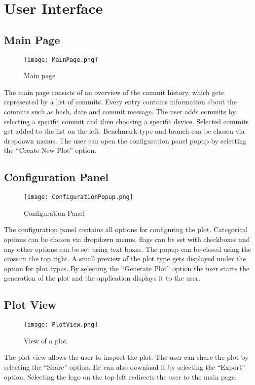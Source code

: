 \section{User Interface}

\subsection{Main Page}

\begin{figure}[H]
    \texttt{[image: MainPage.png]}
    \caption{Main page}
    \label{ui:main}
\end{figure}

The main page consists of an overview of the commit history, which gets represented by a list of commits. Every entry contains information about the commits such as hash, date and commit message. The user adds commits by selecting a specific commit and then choosing a specific device. Selected commits get added to the list on the left. Benchmark type and branch can be chosen via dropdown menus. The user can open the configuration panel popup by selecting the \enquote{Create New Plot} option.

\subsection{Configuration Panel}

\begin{figure}[H]
    \texttt{[image: ConfigurationPopup.png]}
    \caption{Configuration Panel}
    \label{ui:config}
\end{figure}

The configuration panel contains all options for configuring the \gls{plot}. Categorical options can be chosen via dropdown menus, flags can be set with checkboxes and any other options can be set using text boxes. The popup can be closed using the cross in the top right. A small preview of the \gls{plot} type gets displayed under the option for \glspl{plot type}. By selecting the \enquote{Generate Plot} option the user starts the generation of the \gls{plot} and the application displays it to the user.

\subsection{Plot View}

\begin{figure}[H]
    \texttt{[image: PlotView.png]}
    \caption{View of a \gls{plot}}
    \label{ui:plot}
\end{figure}

The plot view allows the user to inspect the \gls{plot}. The user can share the \gls{plot} by selecting the \enquote{Share} option. He can also download it by selecting the \enquote{Export} option. Selecting the logo on the top left redirects the user to the main page.
